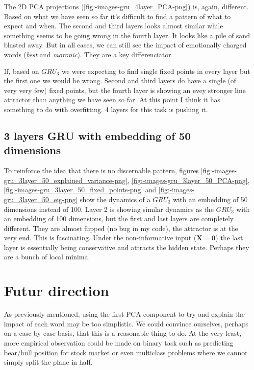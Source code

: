 \documentclass{article}
\begin{document}
The 2D PCA projections (\ref{fig:-images-gru_4layer_PCA-png}) is, again, different. Based on what we have seen so far it's difficult to find a pattern of what to expect and when. The second and third layers looks almost similar while something seems to be going wrong in the fourth layer. It looks like a pile of sand blasted away. But in all cases, we can still see the impact of emotionally charged words (\textit{best} and \textit{moronic}). They are a key differenciator.

If, based on $GRU_3$ we were expecting to find single fixed points in every layer but the first one we would be wrong. Second and third layers do have a single (of very very few) fixed points, but the fourth layer is showing an evey stronger line attractor than anything we have seen so far. At this point I think it has something to do with overfitting. 4 layers for this task is pushing it.

\subsection{3 layers GRU with embedding of 50 dimensions}
To reinforce the idea that there is no discernable pattern, figures \ref{fig:-images-gru_3layer_50_explained_variance-png}, \ref{fig:-images-gru_3layer_50_PCA-png}, \ref{fig:-images-gru_3layer_50_fixed_points-png} and \ref{fig:-images-gru_3layer_50_eig-png} show the dynamics of a $GRU_3$ with an embedding of 50 dimensions instead of 100. Layer 2 is showing similar dynamics as the $GRU_3$ with an embedding of 100 dimensions, but the first and last layers are completely different. They are almost flipped (no bug in my code), the attractor is at the very end. This is fascinating. Under the non-informative input ($\mathbf{X} = \mathbf{0}$) the last layer is essentially being conservative and attracts the hidden state. Perhaps they are a bunch of local minima.


\section{Futur direction}
\label{sec:futur-direction}

As previously mentioned, using the first PCA component to try and explain the impact of each word may be too simplistic. We could convince ourselves, perhaps on a case-by-case basis, that this is a reasonable thing to do. At the very least, more empirical observation could be made on binary task such as predicting bear/bull position for stock market or even multiclass problems where we cannot simply split the plane in half.
\end{document}

